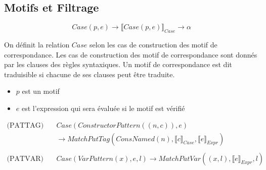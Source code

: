 \documentclass[
  12pt,
]{article}
\providecommand{\tightlist}{%
  \setlength{\itemsep}{0pt}\setlength{\parskip}{0pt}}
\begin{document}
\subsection{Motifs et Filtrage}\label{motifs-et-filtrage}

\[ Case(p,e) \rightarrow \llbracket Case(p,e) \rrbracket_{Case} \rightarrow \alpha \]

On définit la relation \({Case}\) selon les cas de construction
des motif de correspondance. Les cas de construction des motif de
correspondance sont donnés par les clauses des règles syntaxiques. Un
motif de correspondance est dit traduisible si chacune de ses clauses
peut être traduite.
\begin{itemize}
  \tightlist
  \item
        \(p\) est un motif
  \item
        \(e\) est l'expression qui sera évaluée si le motif est vérifié
\end{itemize}
\begin{align*}
  \text{(PATTAG)} \quad & Case(ConstructorPattern((n,c)), e)
  \\ &\rightarrow  MatchPatTag(ConsNamed(n), \llbracket c \rrbracket_{Case}, \llbracket e \rrbracket_{Expr})        \\
  \\
  \text{(PATVAR)} \quad & Case(VarPattern(x), e, l)
  \rightarrow  MatchPatVar((x, l), \llbracket e \rrbracket_{Expr}, l)
\end{align*}
\end{document}

